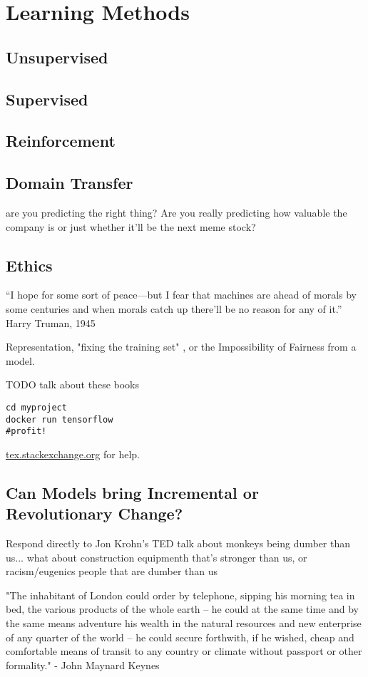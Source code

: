 \setchapterpreamble[u]{\margintoc}
\chapter{Learning Methods}

\section{Unsupervised}
\section{Supervised}
\section{Reinforcement}
\section{Domain Transfer}

are you predicting the right thing? Are you really predicting how valuable the company is or just whether it'll be the next meme stock?

\section{Ethics}

“I hope for some sort of peace—but I fear that machines are ahead of morals by some centuries and when morals catch up there'll be no reason for any of it.” Harry Truman, 1945 

Representation, "fixing the training set" , or the Impossibility of Fairness from a model.

TODO talk about these books
\cite{Oneil2017}
\cite{Perez2019}
\cite{Blackman2022Jul}
\cite{Christian2020}


\begin{lstlisting}[style=kaolstplain,linewidth=1.5\textwidth]
cd myproject
docker run tensorflow
#profit!
\end{lstlisting}

\url{tex.stackexchange.org} for help.

\section{Can Models bring Incremental or Revolutionary Change?}

Respond directly to Jon Krohn's TED talk about monkeys being dumber than us... what about construction equipmenth that's stronger than us, or racism/eugenics people that are dumber than us 

"The inhabitant of London could order by telephone, sipping his morning tea in bed, the various products of the whole earth -- he could at the same time and by the same means adventure his wealth in the natural resources and new enterprise of any quarter of the world -- he could secure forthwith, if he wished, cheap and comfortable means of transit to any country or climate without passport or other formality." - John Maynard Keynes 
